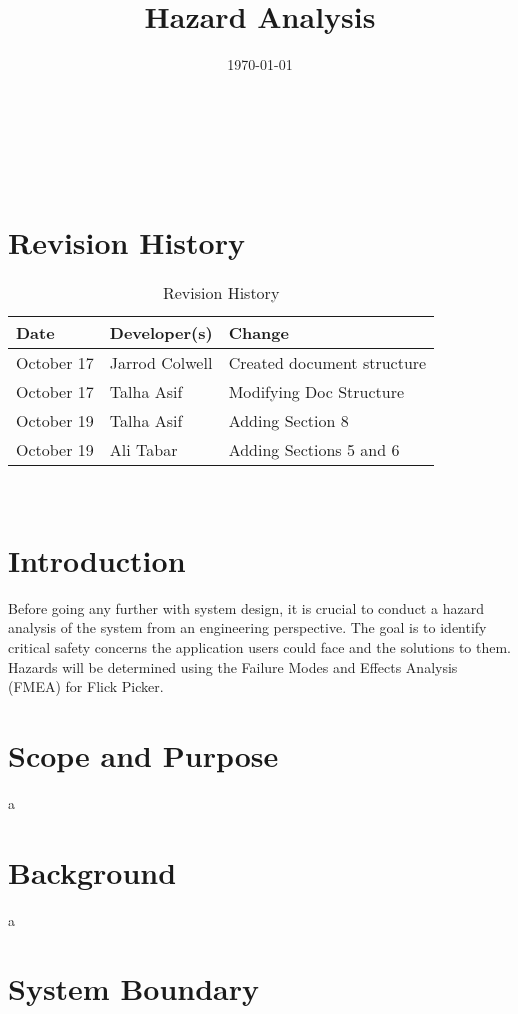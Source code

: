 \documentclass[12pt]{article}
\title{Hazard Analysis\\\progname}
\author{\authname}
\date{\today}
\begin{document}
\maketitle

~\newpage {}

\tableofcontents

~\newpage

\section*{Revision History}
\begin{table}[hp]
	\caption{Revision History} \label{TblRevisionHistory}
	\begin{tabularx}{\textwidth}{llX}
		\toprule
		\textbf{Date} & \textbf{Developer(s)} & \textbf{Change}\\
		\midrule
		October 17 & Jarrod Colwell & Created document structure\\
		October 17 & Talha Asif & Modifying Doc Structure\\
		October 19 & Talha Asif & Adding Section 8\\
		October 19 & Ali Tabar & Adding Sections 5 and 6\\
		\bottomrule
		\end{tabularx}
\end{table}

~\newpage {}

\section{Introduction}
Before going any further with system design, it is crucial to conduct a hazard analysis of the system from an engineering perspective. The goal is to identify critical safety concerns the application users could face and the solutions to them. Hazards will be determined using the Failure Modes and Effects Analysis (FMEA) for Flick Picker.

\section{Scope and Purpose}
a

\section{Background}
a

\section{System Boundary}
\end{document}
